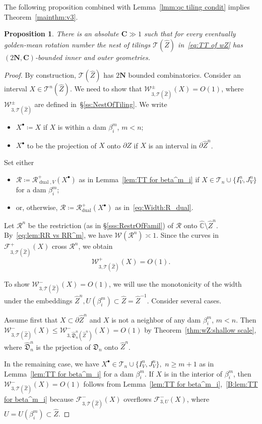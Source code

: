\documentclass{amsart}
\newcommand{\1}{{\mathbb 1 }}
\newcommand{\Fam}{{\mathcal F}}
\newcommand{\Width}{{\mathcal W}}
\newcommand\TT{\mathcal{T}}
\newcommand{\bC}{{\mathbf{C}}}
\newcommand\RR{\mathcal{R}}
\newcommand{\bN}{{\mathbf N}}
\newcommand{\wZ}{{\widehat Z}}
\newcommand\dual{{\operatorname{dual}}}
\newcommand{\wC}{\widehat{\mathbb{C}}}
\newcommand{\Dbb}{{\mathfrak{D}}}
\newtheorem{prop}[thm]{Proposition}
\theoremstyle{remark}
\numberwithin{equation}{section}
\theoremstyle{definition}
\begin{document}
The following proposition combined with Lemma~\ref{lmm:qc tiling condit} implies Theorem~\ref{mainthm:v3}.
\begin{prop}\label{prop:wZ:tiling}There is an absolute $\bC\gg 1$ such that for every eventually golden-mean rotation number the nest of tilings $\TT(\wZ)$ in~\eqref{eq:TT of wZ} has $(2\bN, \bC)$-bounded inner and outer geometries.
\end{prop}
\begin{proof}
By construction, $\TT(\wZ)$ has $2\bN$ bounded combinatorics. Consider an interval $X\in \TT^n(\wZ)$. We need to show that $\Width^\pm _{3,\TT(\wZ)}(X)=O(1)$, where $\Width^\pm _{3,\TT(\wZ)}$ are defined in~\S\ref{ss:NestOfTiling}. We write 
\begin{itemize}
\item $X^\bullet\coloneqq X$ if $X$ is within a dam $\beta^m_i$, $m<n$;
\item $X^\bullet$ to be the projection of $X$ onto $\partial Z$ if $X$ is an interval in $\partial \wZ^n$.
\end{itemize}

Set either 
\begin{itemize}
\item $\RR\coloneqq \RR^+_{\dual,V}(X^\bullet)$ as in Lemma~\ref{lem:TT for beta^m_i} if  $X\in \TT_{n}\cup\{I^n_V,J^n_V\}$ for a dam $\beta^m_i$;
\item or, otherwise, $\RR\coloneqq \RR^+_\dual(X^\bullet) $ as in~\eqref{eq:Width:R_dual}.
\end{itemize}
 Let $\RR^n$ be the restriction (as in \S\ref{sss:RestrOfFamil}) of $\RR$ onto $\wC\setminus \wZ^n$. By~\eqref{eq:lem:RR vs RR^m}, we have $\Width(\RR^n)\asymp 1$. Since the curves in $\Fam^+ _{3,\TT(\wZ)}(X)$ cross $\RR^n$, we obtain \[\Width^+ _{3,\TT(\wZ)}(X)=O(1).\]
 
To show $\Width^- _{3,\TT(\wZ)}(X)=O(1)$, we will use the monotonicity of the width under the embeddings $\wZ^n, U(\beta^m_i)\subset \wZ=\wZ^{-1}$. Consider several cases.

 
Assume first that $X\subset \partial \wZ^n$ and $X$ is not a neighbor of any dam $\beta^m_i$, $m<n$. Then $\Width^- _{3,\TT(\wZ)}(X)\le \Width^-_{3,\widehat \Dbb_n^n(\wZ^n)}(X)=O(1)$ by Theorem~\ref{thm:wZ:shallow scale}, where $\widehat \Dbb_n^n$ is the prjection of $\Dbb_n$ onto $\wZ^n$.

In the remaining case, we have $X^\bullet\in \TT_{n}\cup\{I^n_V,J^n_V\},$ $n\ge m+1$ as in Lemma~\ref{lem:TT for beta^m_i} for a dam $\beta^m_i$. If $X$ is in the interior of $\beta^m_i$, then $\Width^-_{3,\TT(\wZ)}(X)=O(1)$ follows from Lemma~\ref{lem:TT for beta^m_i},~\ref{B:lem:TT for beta^m_i} because $\Fam^-_{3,\TT(\wZ)}(X)$ overflows $\Fam_{3,U}^-(X)$, where $U=U(\beta^m_i)\subset \wZ$. 


\end{proof}
\end{document}
